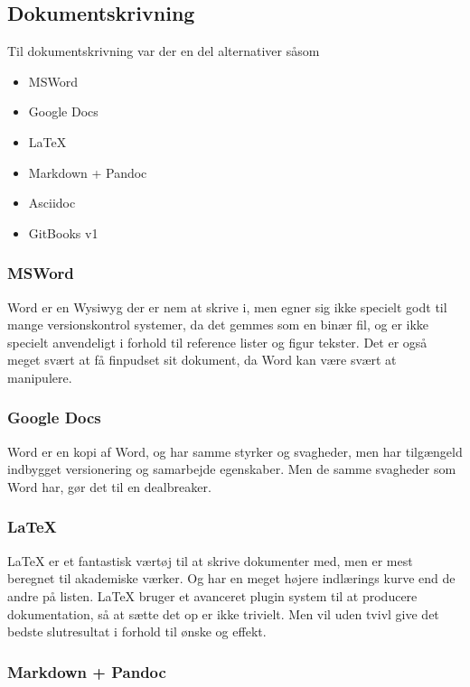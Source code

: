 \subsection{Dokumentskrivning}

Til dokumentskrivning var der en del alternativer såsom

\begin{itemize}
    \item MSWord
    \item Google Docs
    \item \LaTeX
    \item Markdown + Pandoc
    \item Asciidoc
    \item GitBooks v1
\end{itemize}

\subsubsection{MSWord}

Word er en Wysiwyg der er nem at skrive i, men egner sig ikke specielt godt til mange versionskontrol systemer, da det gemmes som en binær fil, og er ikke specielt anvendeligt i forhold til reference lister og figur tekster. Det er også meget svært at få finpudset sit dokument, da Word kan være svært at manipulere.

\subsubsection{Google Docs}

Word er en kopi af Word, og har samme styrker og svagheder, men har tilgængeld indbygget versionering og samarbejde egenskaber. Men de samme svagheder som Word har, gør det til en dealbreaker.

\subsubsection{\LaTeX}

LaTeX er et fantastisk værtøj til at skrive dokumenter med, men er mest beregnet til akademiske værker. Og har en meget højere indlærings kurve end de andre på listen. LaTeX bruger et avanceret plugin system til at producere dokumentation, så at sætte det op er ikke trivielt. Men vil uden tvivl give det bedste slutresultat i forhold til ønske og effekt.

\subsubsection{Markdown + Pandoc}

